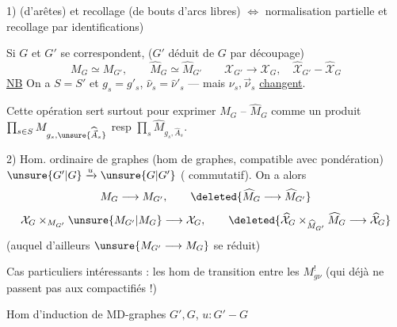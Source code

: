 
1)  (d'arêtes) et recollage (de bouts d'arcs libres)
$\Longleftrightarrow$ normalisation partielle et recollage par identifications)

Si $G$ et $G'$ se correspondent, ($G'$ déduit de $G$ par découpage)
\[
M_G\simeq M_{G'},\qquad \widehat M_G\simeq\widehat M_{G'}\qquad
\mathcal X_{G'}\longrightarrow\mathcal X_G,\quad \widehat{\mathcal X}_{G'}-\widehat{\mathcal X}_G
\]
\uline{NB} On a $S=S'$ et $g_s=g'_s$, $\widehat\nu_s=\widehat\nu'_s$ --- mais \deleted{$\unsure{\nu}$} $\nu_s,\vec\nu_s$ \uline{changent}.

Cette opération sert surtout pour exprimer  $M_G$ -- $\widehat M_G$ comme un produit $\prod_{s\in S}M_{g_s,\unsure{\widehat{\vec A}_s}}$ resp $\prod_s\widehat M_{g_s,\widehat A_s}$.

2) Hom. ordinaire de graphes  (hom de graphes, compatible avec pondération) $\unsure{G'|G}\xrightarrow{u}\unsure{G|G'}$ (
commutatif). On a alors
\[
M_G\longrightarrow M_{G'},\qquad
\deleted{\widehat M_G\longrightarrow\widehat M_{G'}}
\]
\[
\mathcal X_G\mathbin{\times}_{M_{G'}}\unsure{M_{G'}|M_G}\longrightarrow\mathcal X_G,\qquad
\deleted{\widehat{\mathcal X}_G\mathbin{\times}_{\widehat M_{G'}}\widehat M_G\longrightarrow\widehat{\mathcal X}_G}
\]
(auquel d'ailleurs $\unsure{M_{G'}\longrightarrow M_G}$ se réduit)


Cas particuliers intéressants : les hom de transition  entre les $M_{g\nu}^{!}$ (qui déjà ne passent pas aux compactifiés !)

Hom d'induction de MD-graphes $G',G$, $u:G'-G$

